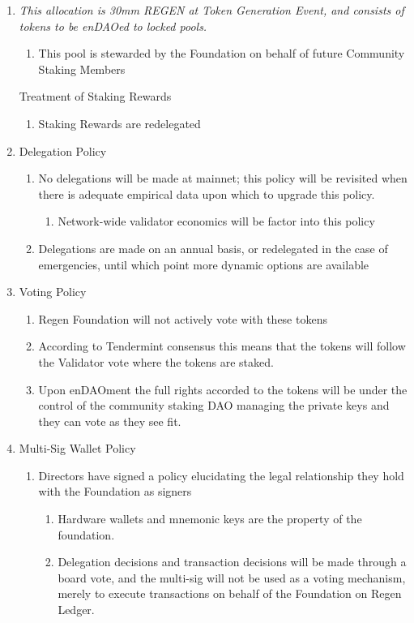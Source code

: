 \documentclass{article}
\begin{document}
\begin{enumerate}
\begin{enumerate}
\item {\it This allocation is 30mm REGEN at Token Generation Event, and consists of tokens to be enDAOed to locked pools.}
\begin{enumerate}
\item This pool is stewarded by the Foundation on behalf of future Community Staking Members
\end{enumerate}
Treatment of Staking Rewards
\begin{enumerate}
\item Staking Rewards are redelegated
\end{enumerate}
\item Delegation Policy
\begin{enumerate}
\item No delegations will be made at mainnet; this policy will be revisited when there is adequate empirical data upon which to upgrade this policy.
\begin{enumerate}
\item Network-wide validator economics will be factor into this policy
\end{enumerate}
\item Delegations are made on an annual basis, or redelegated in the case of emergencies, until which point more dynamic options are available
\end{enumerate}
\item Voting Policy
\begin{enumerate}
\item Regen Foundation will not actively vote with these tokens
\item According to Tendermint consensus this means that the tokens will follow the Validator vote where the tokens are staked.  
\item Upon enDAOment the full rights accorded to the tokens will be under the control of the community staking DAO managing the private keys and they can vote as they see fit.
\end{enumerate}
\item Multi-Sig Wallet Policy
\begin{enumerate}
\item Directors have signed a policy elucidating the legal relationship they hold with the Foundation as signers
\begin{enumerate}
\item Hardware wallets and mnemonic keys are the property of the foundation.
\item Delegation decisions and transaction decisions will be made through a board vote, and the multi-sig will not be used as a voting mechanism, merely to execute transactions on behalf of the Foundation on Regen Ledger.

\end{enumerate}
\end{enumerate}
\end{enumerate}
\end{enumerate}
\end{document}
